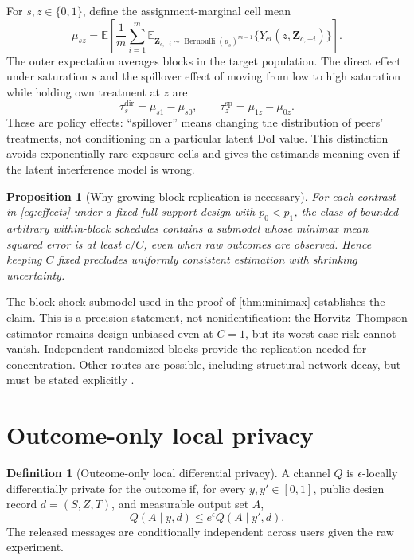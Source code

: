 \documentclass[10pt]{article}
\newtheorem{proposition}[theorem]{Proposition}
\theoremstyle{definition}
\newtheorem{definition}[theorem]{Definition}
\theoremstyle{remark}
\newcommand{\E}{\mathbb{E}}
\DeclareMathOperator{\Bern}{Bernoulli}
\begin{document}
For $s,z\in\{0,1\}$, define the assignment-marginal cell mean
\begin{equation}
  \mu_{sz}
  = \E\!\left[
      \frac{1}{m}\sum_{i=1}^m
      \E_{\mathbf Z_{c,-i}\sim\Bern(p_s)^{m-1}}
      \{Y_{ci}(z,\mathbf Z_{c,-i})\}
    \right].
  \label{eq:cellmean}
\end{equation}
The outer expectation averages blocks in the target population. The direct effect under
saturation $s$ and the spillover effect of moving from low to high saturation while holding
own treatment at $z$ are
\begin{equation}
  \tau^{\mathrm{dir}}_s=\mu_{s1}-\mu_{s0},
  \qquad
  \tau^{\mathrm{sp}}_z=\mu_{1z}-\mu_{0z}.
  \label{eq:effects}
\end{equation}
These are policy effects: ``spillover'' means changing the distribution of peers' treatments,
not conditioning on a particular latent DoI value. This distinction avoids exponentially rare
exposure cells and gives the estimands meaning even if the latent interference model is wrong.

\begin{proposition}[Why growing block replication is necessary]
\label{prop:replication}
For each contrast in \eqref{eq:effects} under a fixed full-support design with $p_0<p_1$, the
class of bounded arbitrary within-block schedules contains a submodel whose minimax mean
squared error is at least $c/C$, even when raw outcomes are observed. Hence keeping $C$ fixed
precludes uniformly consistent estimation with shrinking uncertainty.
\end{proposition}

The block-shock submodel used in the proof of \cref{thm:minimax} establishes the claim. This is
a precision statement, not nonidentification: the Horvitz--Thompson estimator remains
design-unbiased even at $C=1$, but its worst-case risk cannot vanish. Independent randomized
blocks provide the replication needed for concentration. Other routes are possible, including
structural network decay, but must be stated explicitly
\citep{BasseAiroldi2018,Leung2022}.

\section{Outcome-only local privacy}
\label{sec:privacy}

\begin{definition}[Outcome-only local differential privacy]
A channel $Q$ is $\epsilon$-locally differentially private for the outcome if, for every
$y,y'\in[0,1]$, public design record $d=(S,Z,T)$, and measurable output set $A$,
\[
  Q(A\mid y,d)\le e^{\epsilon}Q(A\mid y',d).
\]
The released messages are conditionally independent across users given the raw experiment.
\end{definition}
\end{document}
